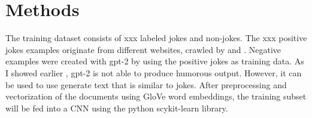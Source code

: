 \documentclass[12pt]{scrartcl}
\begin{document}
\section{Methods}
The training dataset consists of xxx labeled jokes and non-jokes. The xxx positive jokes examples originate from different websites, crawled by \cite{pungasDatasetEnglishPlaintext2017} and \cite{moudgilPythonScriptsBuilding2017}. Negative examples were created with gpt-2 by using the positive jokes as training data. As I showed earlier \citep{aminComputationalHumorAutomatic2019}, gpt-2 is not able to produce humorous output. However, it can be used to use generate text that is similar to jokes. 
After preprocessing and vectorization of the documents using GloVe word embeddings, the training subset will be fed into a CNN using the python scykit-learn library. 




\end{document}
